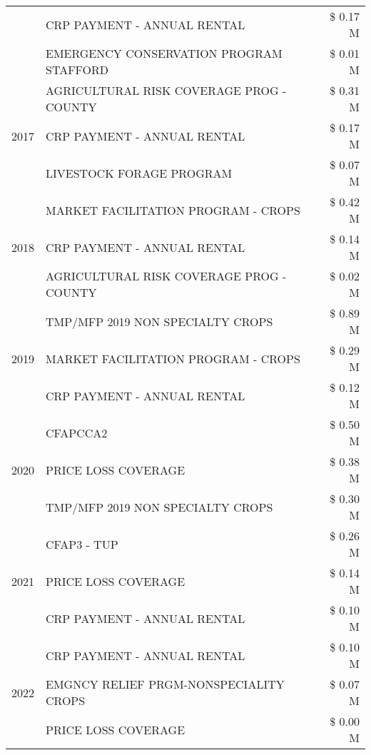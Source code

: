 \begin{tabular}{llr}
 & CRP PAYMENT - ANNUAL RENTAL & \$ 0.17 M \\
 & EMERGENCY CONSERVATION PROGRAM STAFFORD & \$ 0.01 M \\
\cline{1-3}
\multirow[t]{3}{*}{2017} & AGRICULTURAL RISK COVERAGE PROG - COUNTY & \$ 0.31 M \\
 & CRP PAYMENT - ANNUAL RENTAL & \$ 0.17 M \\
 & LIVESTOCK FORAGE PROGRAM & \$ 0.07 M \\
\cline{1-3}
\multirow[t]{3}{*}{2018} & MARKET FACILITATION PROGRAM - CROPS & \$ 0.42 M \\
 & CRP PAYMENT - ANNUAL RENTAL & \$ 0.14 M \\
 & AGRICULTURAL RISK COVERAGE PROG - COUNTY & \$ 0.02 M \\
\cline{1-3}
\multirow[t]{3}{*}{2019} & TMP/MFP 2019 NON SPECIALTY CROPS & \$ 0.89 M \\
 & MARKET FACILITATION PROGRAM - CROPS & \$ 0.29 M \\
 & CRP PAYMENT - ANNUAL RENTAL & \$ 0.12 M \\
\cline{1-3}
\multirow[t]{3}{*}{2020} & CFAPCCA2 & \$ 0.50 M \\
 & PRICE LOSS COVERAGE & \$ 0.38 M \\
 & TMP/MFP 2019 NON SPECIALTY CROPS & \$ 0.30 M \\
\cline{1-3}
\multirow[t]{3}{*}{2021} & CFAP3 - TUP & \$ 0.26 M \\
 & PRICE LOSS COVERAGE & \$ 0.14 M \\
 & CRP PAYMENT - ANNUAL RENTAL & \$ 0.10 M \\
\cline{1-3}
\multirow[t]{3}{*}{2022} & CRP PAYMENT - ANNUAL RENTAL & \$ 0.10 M \\
 & EMGNCY RELIEF PRGM-NONSPECIALITY CROPS & \$ 0.07 M \\
 & PRICE LOSS COVERAGE & \$ 0.00 M \\
\cline{1-3}
\bottomrule
\end{tabular}
